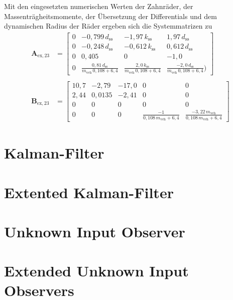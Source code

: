Mit den eingesetzten numerischen Werten der Zahnräder, der Massenträgheitsmomente, der Übersetzung der Differentials und dem dynamischen Radius der Räder ergeben sich die Systemmatrizen zu
\begin{align}
\pmb{A}_\mathrm{ex,23} &= \begin{bmatrix} 0 & -0,799\,d_\mathrm{ss} & -1,97\,k_\mathrm{ss} & 1,97\,d_\mathrm{ss} \\
0 & -0,248\,d_\mathrm{ss} & -0,612\,k_\mathrm{ss} & 0,612\,d_\mathrm{ss}\\
0 & 0,405 & 0 & -1,0\\
0 & \frac{0,81\,d_\mathrm{ss}}{m_\mathrm{veh}\,0,108 + 6,4} & \frac{2,0\,k_\mathrm{ss}}{m_\mathrm{veh}\,0,108 + 6,4} & \frac{-2,0\,d_\mathrm{ss}}{m_\mathrm{veh}\,0,108 + 6,4})\end{bmatrix}\\
\nonumber \\
\pmb{B}_\mathrm{ex,23} &= \begin{bmatrix} 10,7 & -2,79 & -17,0 & 0 & 0\\
2,44 & 0,0135 & -2,41 & 0 & 0 \\
0 & 0 & 0 & 0 & 0\\
0 & 0 & 0 & \frac{-1}{0,108\,m_\mathrm{veh} + 6,4} & \frac{-3,22\,m_\mathrm{veh}}{0,108\,m_\mathrm{veh} + 6,4} \end{bmatrix}
\end{align}

\section{Kalman-Filter}
\section{Extented Kalman-Filter}
\section{Unknown Input Observer}
\section{Extended Unknown Input Observers}





